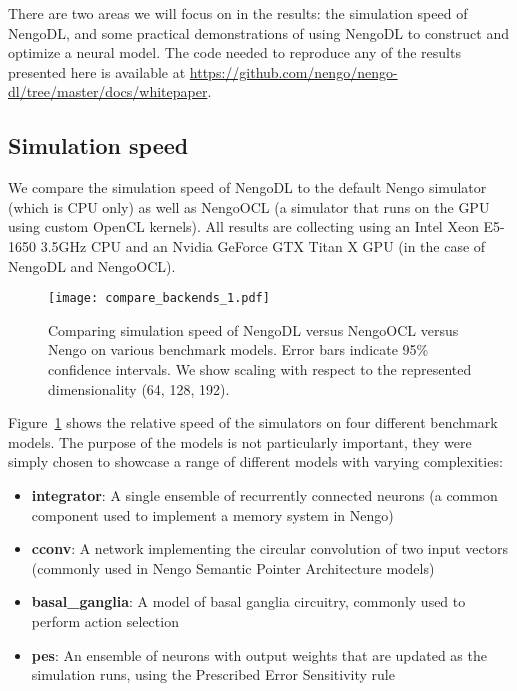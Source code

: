 \documentclass{article}
\begin{document}
There are two areas we will focus on in the results: the simulation speed of NengoDL, and some practical demonstrations of using NengoDL to construct and optimize a neural model.  The code needed to reproduce any of the results presented here is available at \url{https://github.com/nengo/nengo-dl/tree/master/docs/whitepaper}. 

\subsection{Simulation speed}

We compare the simulation speed of NengoDL to the default Nengo simulator (which is CPU only) as well as NengoOCL (a simulator that runs on the GPU using custom OpenCL kernels).  All results are collecting using an Intel Xeon E5-1650 3.5GHz CPU and an Nvidia GeForce GTX Titan X GPU (in the case of NengoDL and NengoOCL).

\begin{figure}
\centering
\texttt{[image: compare\_backends\_1.pdf]}
\caption{Comparing simulation speed of NengoDL versus NengoOCL versus Nengo on various benchmark models.  Error bars indicate 95\% confidence intervals.  We show scaling with respect to the represented dimensionality (64, 128, 192).}
\label{fig:compare_backends_1}
\end{figure}

Figure~\ref{fig:compare_backends_1} shows the relative speed of the simulators on four different benchmark models.  The purpose of the models is not particularly important, they were simply chosen to showcase a range of different models with varying complexities:

\begin{itemize}
\item {\bf integrator}: A single ensemble of recurrently connected neurons (a common component used to implement a memory system in Nengo)
\item {\bf cconv}: A network implementing the circular convolution of two input vectors (commonly used in Nengo Semantic Pointer Architecture models)
\item {\bf basal_ganglia}: A model of basal ganglia circuitry, commonly used to perform action selection
\item {\bf pes}: An ensemble of neurons with output weights that are updated as the simulation runs, using the Prescribed Error Sensitivity rule \citep{MacNeil2011}
\end{itemize}
\end{document}
